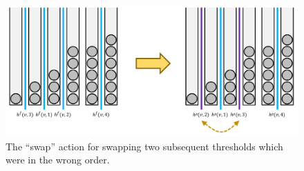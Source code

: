 
\begin{figure}
    \centering
    \includegraphics[scale=0.5]{Chapter4/Figs/k_thinning_swap.pdf}
    \caption{The ``swap'' action for \KThinning swapping two subsequent thresholds which were in the wrong order.}
    \label{k-thinning-swap-action}
\end{figure}